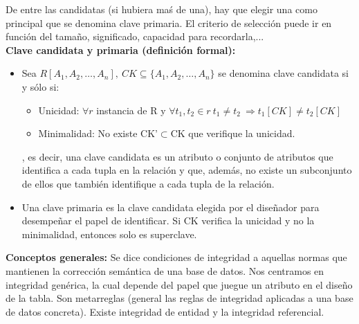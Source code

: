 \documentclass[a4paper,11pt]{article}
\begin{document}
De entre las candidatas (si hubiera maś de una), hay que elegir una como principal que se denomina clave primaria. El criterio de selección puede ir en función del tamaño, significado, capacidad para recordarla,...\\

\textbf{Clave candidata y primaria (definición formal):}

\begin{itemize}
\item Sea $R[A_1,A_2,\ldots,A_n], \> CK \subseteq \{A_1,A_2,\ldots,A_n\}$ se denomina clave candidata si y sólo si:

	\begin{itemize}
		\item Unicidad: $\forall r$ instancia de R y $\forall t_1,t_2\in r \> t_1 \neq t_2 \> \Rightarrow t_1[CK]\neq t_2[CK]$
		
		\item Minimalidad: No existe CK'$\subset$CK que verifique la unicidad.
	\end{itemize}
	
, es decir, una clave candidata es un atributo o conjunto de atributos que identifica a cada tupla en la relación y que, además, no existe un subconjunto de ellos que también identifique a cada tupla de la relación.

\item Una clave primaria es la clave candidata elegida por el diseñador para desempeñar el papel de identificar. Si CK verifica la unicidad y no la minimalidad, entonces solo es superclave.
\end{itemize}

\textbf{Conceptos generales:}
Se dice condiciones de integridad a aquellas normas que mantienen la corrección semántica de una base de datos. Nos centramos en integridad genérica, la cual depende del papel que juegue un atributo en el diseño de la tabla. Son metarreglas (general las reglas de integridad aplicadas a una base de datos concreta). Existe integridad de entidad y la integridad referencial.
\end{document}

